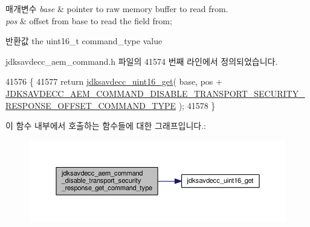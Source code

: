 \begin{DoxyParams}{매개변수}
{\em base} & pointer to raw memory buffer to read from. \\
\hline
{\em pos} & offset from base to read the field from; \\
\hline
\end{DoxyParams}
\begin{DoxyReturn}{반환값}
the uint16\+\_\+t command\+\_\+type value 
\end{DoxyReturn}


jdksavdecc\+\_\+aem\+\_\+command.\+h 파일의 41574 번째 라인에서 정의되었습니다.


\begin{DoxyCode}
41576 \{
41577     \textcolor{keywordflow}{return} \hyperlink{group__endian_ga3fbbbc20be954aa61e039872965b0dc9}{jdksavdecc\_uint16\_get}( base, pos + 
      \hyperlink{group__command__disable__transport__security__response_ga5ad83b5c1d2c2f0abfb991c855588868}{JDKSAVDECC\_AEM\_COMMAND\_DISABLE\_TRANSPORT\_SECURITY\_RESPONSE\_OFFSET\_COMMAND\_TYPE}
       );
41578 \}
\end{DoxyCode}


이 함수 내부에서 호출하는 함수들에 대한 그래프입니다.\+:
\nopagebreak
\begin{figure}[H]
\begin{center}
\leavevmode
\includegraphics[width=350pt]{group__command__disable__transport__security__response_ga7a2ef0a51433537e5ec4613496f658c5_cgraph}
\end{center}
\end{figure}



